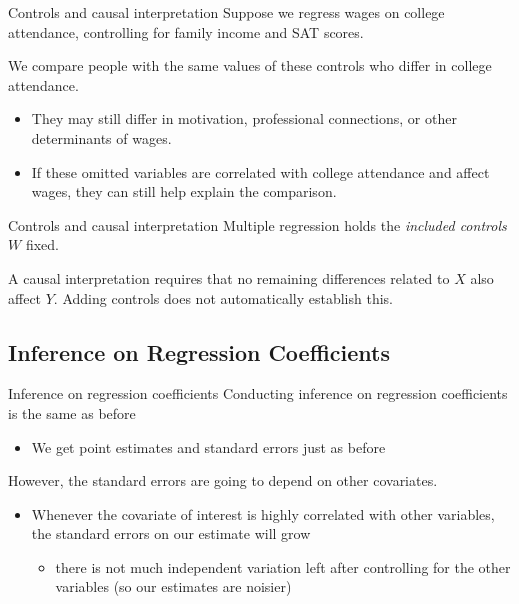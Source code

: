 \documentclass[aspectratio=169,t,11pt,table]{beamer}
\begin{document}
\begin{frame}{Controls and causal interpretation}
  Suppose we regress wages on college attendance, controlling for family income and SAT scores.

  \bigskip
  We compare people with the same values of these controls who differ in college attendance.
  \begin{itemize}
    \item They may still differ in motivation, professional connections, or other determinants of wages.
    \item If these omitted variables are correlated with college attendance and affect wages, they can still help explain the comparison.
  \end{itemize}
\end{frame}

\begin{frame}{Controls and causal interpretation}
  Multiple regression holds the \emph{included controls $W$} fixed.

  \bigskip
  A causal interpretation requires that no remaining differences related to $X$ also affect $Y$.
  Adding controls does not automatically establish this.
\end{frame}

\subsection{Inference on Regression Coefficients}

\begin{frame}{Inference on regression coefficients}
  Conducting inference on regression coefficients is the same as before
  \begin{itemize}
    \item We get point estimates and standard errors just as before
  \end{itemize}

  \pause
  \bigskip
  However, the standard errors are going to depend on other covariates. 

  \begin{itemize}
    \item Whenever the covariate of interest is highly correlated with other variables, the standard errors on our estimate will grow
    
    \begin{itemize}
      \item there is not much independent variation left after controlling for the other variables (so our estimates are noisier)
    \end{itemize}
  \end{itemize}
\end{frame}
\end{document}
